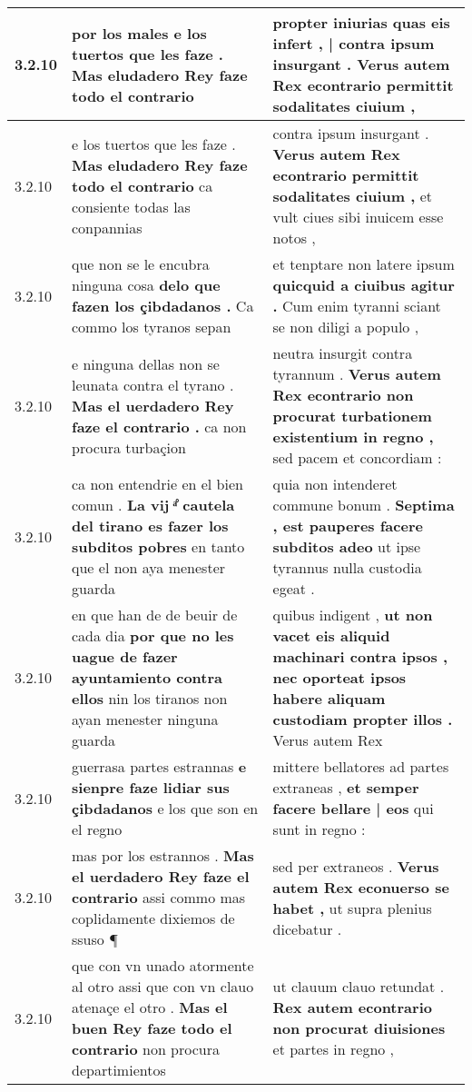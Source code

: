 \begin{tabular}{|p{1cm}|p{6.5cm}|p{6.5cm}|}
3.2.10 & por los males \textbf{ e los tuertos que les faze . } Mas eludadero Rey faze todo el contrario & propter iniurias \textbf{ quas eis infert , | contra ipsum insurgant . } Verus autem Rex econtrario permittit sodalitates ciuium , \\\hline
3.2.10 & e los tuertos que les faze . \textbf{ Mas eludadero Rey faze todo el contrario } ca consiente todas las conpannias & contra ipsum insurgant . \textbf{ Verus autem Rex econtrario permittit sodalitates ciuium , } et vult ciues sibi inuicem esse notos , \\\hline
3.2.10 & que non se le encubra ninguna cosa \textbf{ delo que fazen los çibdadanos . } Ca commo los tyranos sepan & et tenptare non latere ipsum \textbf{ quicquid a ciuibus agitur . } Cum enim tyranni sciant se non diligi a populo , \\\hline
3.2.10 & e ninguna dellas non se leunata contra el tyrano . \textbf{ Mas el uerdadero Rey faze el contrario . } ca non procura turbaçion & neutra insurgit contra tyrannum . \textbf{ Verus autem Rex econtrario non procurat turbationem existentium in regno , } sed pacem et concordiam : \\\hline
3.2.10 & ca non entendrie en el bien comun . \textbf{ La vij ͣ̊ cautela del tirano es fazer los subditos pobres } en tanto que el non aya menester guarda & quia non intenderet commune bonum . \textbf{ Septima , est pauperes facere subditos adeo } ut ipse tyrannus nulla custodia egeat . \\\hline
3.2.10 & en que han de de beuir de cada dia \textbf{ por que no les uague de fazer ayuntamiento contra ellos } nin los tiranos non ayan menester ninguna guarda & quibus indigent , \textbf{ ut non vacet eis aliquid machinari contra ipsos , nec oporteat ipsos habere aliquam custodiam propter illos . } Verus autem Rex \\\hline
3.2.10 & guerrasa partes estrannas \textbf{ e sienpre faze lidiar sus çibdadanos } e los que son en el regno & mittere bellatores ad partes extraneas , \textbf{ et semper facere bellare | eos } qui sunt in regno : \\\hline
3.2.10 & mas por los estrannos . \textbf{ Mas el uerdadero Rey faze el contrario } assi commo mas coplidamente dixiemos de ssuso ¶ & sed per extraneos . \textbf{ Verus autem Rex econuerso se habet , } ut supra plenius dicebatur . \\\hline
3.2.10 & que con vn unado atormente al otro assi que con vn clauo atenaçe el otro . \textbf{ Mas el buen Rey faze todo el contrario } non procura departimientos & ut clauum clauo retundat . \textbf{ Rex autem econtrario non procurat diuisiones } et partes in regno , \\\hline

\end{tabular}

